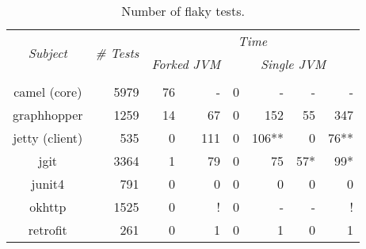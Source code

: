 \begin{table*}[t]
  \centering
  \begin{tabular}{|c|r|r|r|r|r|r|r|}
    \hline
    \multirow{2}{*}{\emph{Subject}} & \multirow{2}{*}{\emph{\# Tests}} &  \multicolumn{6}{c|}{\emph{Time}}\\
    \cline{3-8}
    & & \multicolumn{2}{c|}{\emph{Forked JVM}} & \multicolumn{4}{c|}{\emph{Single JVM}}   \\
    \cline{3-8}
    & & \multicolumn{1}{c|}{\Seq{}} & \multicolumn{1}{c|}{\ParClassSeqMeth{}} & \multicolumn{1}{c|}{\Seq{}} & \multicolumn{1}{c|}{\ParClassSeqMeth{}} & \multicolumn{1}{c|}{\SeqClassParMeth{}} & \multicolumn{1}{c|}{\ParClassParMeth{}}\\     \hline 
    camel (core) & 5979 & 76 & - & 0 & - & - & - \\
    \hline
    graphhopper & 1259 & 14 & 67 & 0 & 152 & 55 & 347 \\
    \hline
    jetty (client) & 535 & 0 & 111 & 0 & 106** & 0 & 76** \\
    \hline
    jgit & 3364 & 1 & 79 & 0 & 75 & 57* & 99* \\
    \hline
    junit4 & 791 & 0 & 0 & 0 & 0 & 0 & 0 \\
    \hline
    okhttp & 1525 & 0 & ! & 0 & - & - & ! \\
    \hline
    retrofit & 261 & 0 & 1 & 0 & 1 & 0 & 1 \\
    \hline
  \end{tabular}
  \caption{\label{table:failures}Number of flaky tests.}
\end{table*}

